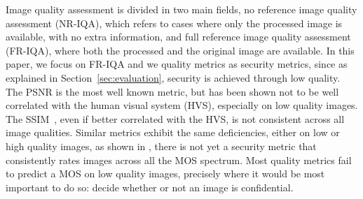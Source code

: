 \documentclass{article}
\begin{document}
Image quality assessment is divided in two main fields, no reference image quality assessment (NR-IQA), which refers to cases where only the processed image is available, with no extra information, and full reference image quality assessment (FR-IQA), where both the processed and the original image are available. In this paper, we focus on FR-IQA and we quality metrics as security metrics, since as explained in Section~\ref{sec:evaluation}, security is achieved through low quality.
The PSNR is the most well known metric, but has been shown not to be well correlated with the human visual system (HVS), especially on low quality images. The SSIM~\cite{wang2004image}, even if better correlated with the HVS, is not consistent across all image qualities. Similar metrics \cite{sheikh2006image, yao2009visual, tong2010visual, sun2011objective} exhibit the same deficiencies, either on low or high quality images, as shown in \cite{hofbauer2016identifying}, there is not yet a security metric that consistently rates images across all the MOS spectrum. Most quality metrics fail to predict a MOS on low quality images, precisely where it would be most important to do so: decide whether or not an image is confidential.
\end{document}
